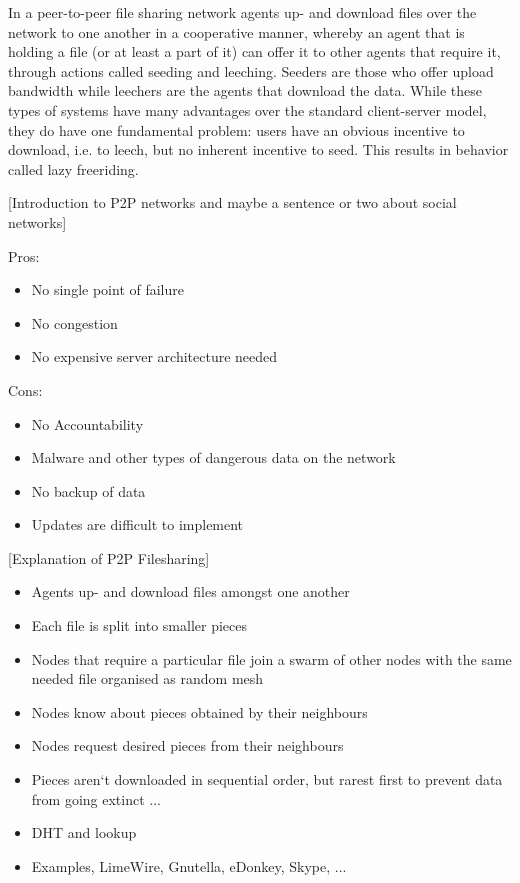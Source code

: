 \documentclass[11pt,a4paper]{article}
\theoremstyle{definition}
\theoremstyle{theorem}
\theoremstyle{proposition}
\theoremstyle{corollary}
\theoremstyle{lemma}
\theoremstyle{example}
\theoremstyle{remark}
\begin{document}
\noindent In a peer-to-peer file sharing network agents up- and download files over the network to one another in a cooperative manner, whereby an agent that is holding a file (or at least a part of it) can offer it to other agents that require it, through actions called seeding and leeching. Seeders are those who offer upload bandwidth while leechers are the agents that download the data. While these types of systems have many advantages over the standard client-server model, they do have one fundamental problem: users have an obvious incentive to download, i.e. to leech, but no inherent incentive to seed. This results in behavior called lazy freeriding. \vspace{1em}\\

\noindent{} \begin{center} [Introduction to P2P networks and maybe a sentence or two about social networks]\vspace{1em}\\ \end{center}
Pros:
\begin{itemize}
\item No single point of failure
\item No congestion
\item No expensive server architecture needed 
\end{itemize}
Cons:
\begin{itemize}
\item No Accountability
\item Malware and other types of dangerous data on the network
\item No backup of data
\item Updates are difficult to implement
\end{itemize}

\noindent{} \begin{center} [Explanation of P2P Filesharing] \vspace{1em}\\ \end{center} 
\begin{itemize}
\item Agents up- and download files amongst one another
\item Each file is split into smaller pieces
\item Nodes that require a particular file join a swarm of other nodes with the same needed file organised as random mesh
\item Nodes know about pieces obtained by their neighbours
\item Nodes request desired pieces from their neighbours
\item Pieces aren‘t downloaded in sequential order, but rarest first to prevent data from going extinct ...
\item DHT and lookup
\item Examples, LimeWire, Gnutella, eDonkey, Skype, ... \vspace{1em}\\
\end{itemize}
\end{document}
